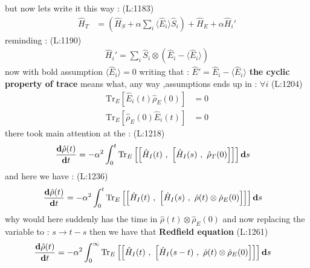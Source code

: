  but now lets write it this way : 
(L:1183)
\begin{equation}
\begin{split}
\hat{H }_{T }&=(\hat{H }_{S }+\alpha \sum _{i }\langle \hat{E }_{i }\rangle \hat{S }_{i })+\hat{H }_{E }+\alpha \hat{H }_{i }'\end{split}
\end{equation}
reminding :  
(L:1190)
\begin{equation}
\begin{split}
\hat{H }_{i }'=\sum _{i }\hat{S }_{i }\otimes (\hat{E }_{i }-\langle \hat{E }_{i }\rangle )\end{split}
\end{equation}
 now with bold assumption
 $ \langle \hat{E }_{i }\rangle =0 $  writing that : 
 $ \hat{E }'=\hat{E }_{i }-\langle \hat{E }_{i }\rangle  $  \textbf{the cyclic property of trace}
 means what, any way  ,assumptions ends up in :
 $ \forall i  $ (L:1204)
\begin{equation}
\begin{split}
\text{Tr}_{E }\left[\hat{E }_{i }(t )\hat{\rho }_{E }(0)\right]&=0\\
\text{Tr}_{E }\left[\hat{\rho }_{E }(0)\hat{E }_{i }(t )\right]&=0\end{split}
\end{equation}
 there took main attention at the :
(L:1218)
\begin{equation}
\begin{split}
\dfrac{\bold{d}\hat{\rho }(t )}{\bold{d}t }&=-\alpha ^{2}\int _{0}^{t }\text{Tr}_{E }\left[\left[\hat{H }_{I }(t )\ ,\ \left[\hat{H }_{I }(s )\ ,\ \hat{\rho }_{T }(0)\right]\right]\right]\bold{d}s \end{split}
\end{equation}
 and here we have : 
(L:1236)
\begin{equation}
\begin{split}
\dfrac{\bold{d}\hat{\rho }(t )}{\bold{d}t }&=-\alpha ^{2}\int _{0}^{t }\text{Tr}_{E }\left[\left[\hat{H }_{I }(t )\ ,\ \left[\hat{H }_{I }(s )\ ,\ \hat{\rho }(t )\otimes \hat{\rho }_{E }(0)\right]\right]\right]\bold{d}s \end{split}
\end{equation}
 why would here suddenly has the time in 
 $ \hat{\rho }(t )\otimes \hat{\rho }_{E }(0) $  and now replacing the variable to :
 $ s \rightarrow t -s  $  then we have that 
\textbf{Redfield equation}
(L:1261)
\begin{equation}
\begin{split}
\label{RedfielEquation}\dfrac{\bold{d}\hat{\rho }(t )}{\bold{d}t }&=-\alpha ^{2}\int _{0}^{\infty }\text{Tr}_{E }\left[\left[\hat{H }_{I }(t )\ ,\ \left[\hat{H }_{I }(s -t )\ ,\ \hat{\rho }(t )\otimes \hat{\rho }_{E }(0)\right]\right]\right]\bold{d}s \end{split}
\end{equation}
